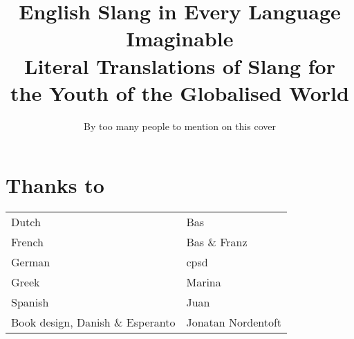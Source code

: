 \documentclass[a5paper,10pt]{book}
\title{\Huge \textbf{English Slang in Every Language Imaginable} \\ \huge Literal Translations of Slang for the Youth of the Globalised World}
\date{}
\author{By too many people to mention on this cover}
\begin{document}
\frontmatter
\maketitle

\tableofcontents

\mainmatter

\chapter{Thanks to}
\begin{tabularx}{\textwidth}{Xl}
Dutch & Bas \\
French & Bas \& Franz \\
German & cpsd \\
Greek & Marina \\
Spanish & Juan \\
Book design, Danish \& Espe\-ranto & Jonatan Nordentoft
\end{tabularx}
\end{document}
